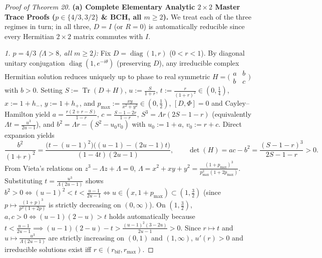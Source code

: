 \documentclass[10pt,letterpaper]{article}
\newcommand{\Tr}{\operatorname{Tr}}
\newcommand{\diag}{\operatorname{diag}}
\begin{document}
\begin{proof}[Proof of Theorem 20]
\textbf{(a) Complete Elementary Analytic $2\times 2$ Master Trace Proofs ($p \in \{4/3, 3/2\}$ \& BCH, all $m \ge 2$).}
We treat each of the three regimes in turn; in all three, $D = I$ (or $R = 0$) is automatically reducible since every Hermitian $2\times 2$ matrix commutes with $I$.

\emph{1. $p = 4/3$ ($\Lambda > 8$, all $m \ge 2$):} Fix $D = \diag(1, r)$ ($0 < r < 1$). By diagonal unitary conjugation $\diag(1, e^{-i\theta})$ (preserving $D$), any irreducible complex Hermitian solution reduces uniquely up to phase to real symmetric $H = \bigl(\begin{smallmatrix} a & b \\ b & c \end{smallmatrix}\bigr)$ with $b > 0$. Setting $S := \Tr(D+H)$, $u := \frac{S}{1+r}$, $t := \frac{r}{(1+r)^2} \in (0, \frac{1}{4})$, $x := 1 + h_-$, $y := 1 + h_+$, and $p_{\max} := \frac{xy}{x^2+y^2} \in (0, \frac{1}{2})$, $[D, \Phi] = 0$ and Cayley--Hamilton yield $a = \frac{r(2+r-S)}{1-r}$, $c = \frac{S-1-2r}{1-r}$, $S^3 = \Lambda r(2S - 1 - r)$ (equivalently $\Lambda t = \frac{u^3}{2u-1}$), and $b^2 = \Lambda r - (S^2 - u_0 v_0)$ with $u_0 := 1 + a$, $v_0 := r + c$. Direct expansion yields
\[
  \frac{b^2}{(1+r)^2} = \frac{\bigl(t - (u-1)^2\bigr)\bigl((u-1) - (2u-1)t\bigr)}{(1-4t)(2u-1)},
  \qquad
  \det(H) = ac - b^2 = \frac{(S-1-r)^3}{2S-1-r} > 0.
\]
From Vieta's relations on $z^3 - \Lambda z + \Lambda = 0$, $\Lambda = x^2 + xy + y^2 = \frac{(1+p_{\max})^3}{p_{\max}^2(1+2p_{\max})}$. Substituting $t = \frac{u^3}{\Lambda(2u-1)}$ shows $b^2 > 0 \iff (u-1)^2 < t < \frac{u-1}{2u-1} \iff u \in (x, 1+p_{\max}) \subset (1, \frac{3}{2})$ (since $p \mapsto \frac{(1+p)^3}{p^2(1+2p)}$ is strictly decreasing on $(0, \infty)$). On $(1, \frac{3}{2})$, $a, c > 0 \iff (u-1)(2-u) > t$ holds automatically because $t < \frac{u-1}{2u-1} \implies (u-1)(2-u)-t > \frac{(u-1)^2(3-2u)}{2u-1} > 0$. Since $r \mapsto t$ and $u \mapsto \frac{u^3}{\Lambda(2u-1)}$ are strictly increasing on $(0,1)$ and $(1,\infty)$, $u'(r) > 0$ and irreducible solutions exist iff $r \in (r_{\mathrm{bif}}, r_{\max})$.


\end{proof}
\end{document}
